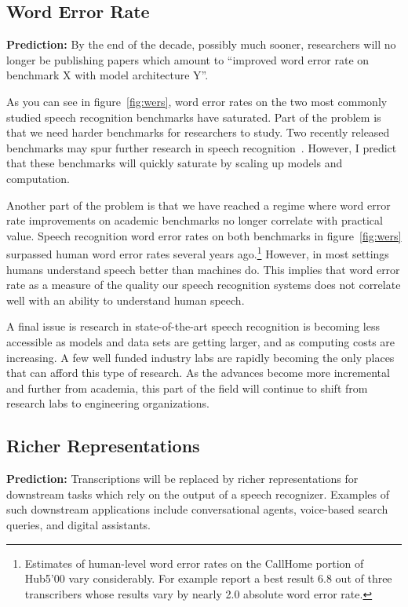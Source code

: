\subsection{Word Error Rate}
\label{sec:wer}

{\bf Prediction:} By the end of the decade, possibly much sooner, researchers
will no longer be publishing papers which amount to ``improved word error rate
on benchmark X with model architecture Y''.

As you can see in figure~\ref{fig:wers}, word error rates on the two most
commonly studied speech recognition benchmarks have saturated. Part of the
problem is that we need harder benchmarks for researchers to study.  Two
recently released benchmarks may spur further research in speech
recognition~\citep{chen2021gigaspeech, galvez2021people}. However, I predict
that these benchmarks will quickly saturate by scaling up models and
computation.

Another part of the problem is that we have reached a regime where word error
rate improvements on academic benchmarks no longer correlate with practical
value. Speech recognition word error rates on both benchmarks in
figure~\ref{fig:wers} surpassed human word error rates several years
ago.\footnote{Estimates of human-level word error rates on the CallHome portion
of Hub5'00 vary considerably. For example \citet{saon2017english} report a best
result 6.8 out of three transcribers whose results vary by nearly 2.0 absolute
word error rate.} However, in most settings humans understand speech better
than machines do. This implies that word error rate as a measure of the quality
our speech recognition systems does not correlate well with an ability to
understand human speech.

A final issue is research in state-of-the-art speech recognition is becoming
less accessible as models and data sets are getting larger, and as computing
costs are increasing. A few well funded industry labs are rapidly becoming the
only places that can afford this type of research. As the advances become more
incremental and further from academia, this part of the field will continue to
shift from research labs to engineering organizations.

\subsection{Richer Representations}

{\bf Prediction:} Transcriptions will be replaced by richer representations for
downstream tasks which rely on the output of a speech recognizer. Examples of
such downstream applications include conversational agents, voice-based search
queries, and digital assistants.

